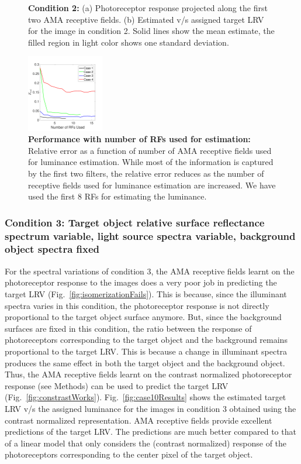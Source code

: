 \documentclass{jov}
\begin{document}
\begin{figure}
\begin{subfigure}[b]{0.3 \textwidth}
        \label{fig:case2Estimates}
    \end{subfigure}
    \caption{{\bf Condition 2:} (a) Photoreceptor response projected along the first two AMA receptive fields. (b) Estimated v/s assigned target LRV for the image in condition 2. Solid lines show the mean estimate, the filled region in light color  shows one standard deviation.}
\label{fig:case2Results}
\end{figure}

\begin{figure}
\centering
\includegraphics[width=0.3\textwidth]{../Figures/Figure11/Figure11.pdf}
\caption{{\bf Performance with number of RFs used for estimation:} Relative error as a function of number of AMA receptive fields used for luminance estimation. While most of the information is captured by the first two filters, the relative error reduces as the number of receptive fields used for luminance estimation are increased. We have used the first 8 RFs for estimating the luminance.}
\label{fig:ErrorVsNFilters}
\end{figure}

\subsubsection{Condition 3: Target object relative surface reflectance spectrum variable, light source spectra variable, background object spectra fixed}
For the spectral variations of condition 3, the AMA receptive fields learnt on the photoreceptor response to the images does a very poor job in predicting the target LRV (Fig.~\ref{fig:isomerizationFails}). 
This is because, since the illuminant spectra varies in this condition, the photoreceptor response is not directly proportional to the target object surface anymore. 
But, since the background surfaces are fixed in this condition, the ratio between the response of  photoreceptors corresponding to the target object and the background remains proportional to the target LRV. 
This is because a change in illuminant spectra produces the same effect in both the target object and the background object. 
Thus, the AMA receptive fields learnt on the contrast normalized photoreceptor response (see Methods) can be used to predict the target LRV (Fig.~\ref{fig:constrastWorks}). 
Fig.~\ref{fig:case10Results} shows the estimated target LRV v/s the assigned luminance for the images in condition 3 obtained using the contrast normalized representation. 
AMA receptive fields provide excellent predictions of the target LRV. 
The predictions are much better compared to that of a linear model that only considers the (contrast normalized) response of the photoreceptors corresponding to the center pixel of the target object.
\end{document}
